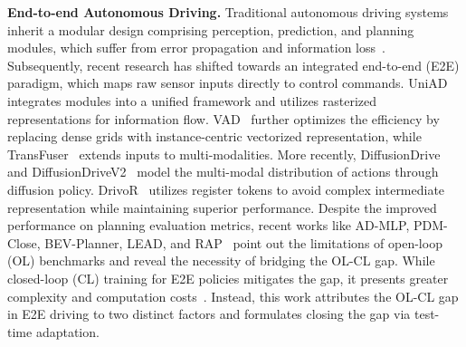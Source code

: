 \documentclass{article}
\begin{document}
\textbf{End-to-end Autonomous Driving.} Traditional autonomous driving systems inherit a modular design comprising perception, prediction, and planning modules, which suffer from error propagation and information loss~\cite{luo2018fast, liang2020pnpnet, sadat2020perceive, li2024womd}. Subsequently, recent research has shifted towards an integrated end-to-end (E2E) paradigm, which maps raw sensor inputs directly to control commands. UniAD~\cite{uniad} integrates modules into a unified framework and utilizes rasterized representations for information flow. VAD~\cite{vad} further optimizes the efficiency by replacing dense grids with instance-centric vectorized representation, while TransFuser~\cite{transfuser} extends inputs to multi-modalities. More recently, DiffusionDrive and DiffusionDriveV2~\cite{diffusiondrive, diffusiondrivev2} model the multi-modal distribution of actions through diffusion policy. DrivoR~\cite{DrivoR} utilizes register tokens to avoid complex intermediate representation while maintaining superior performance.
Despite the improved performance on planning evaluation metrics, recent works like AD-MLP, PDM-Close, BEV-Planner, LEAD, and RAP~\cite{zhai2023rethinking, dauner2023parting, li2024ego, LEAD, RAP} point out the limitations of open-loop (OL) benchmarks and reveal the necessity of bridging the OL-CL gap. While closed-loop (CL) training for E2E policies mitigates the gap, it presents greater complexity and computation costs~\cite{KarkusBeyondBC}. Instead, this work attributes the OL-CL gap in E2E driving to two distinct factors and formulates closing the gap via test-time adaptation.
\end{document}
